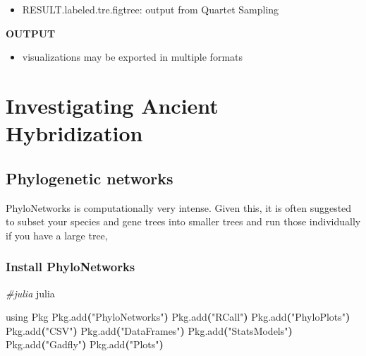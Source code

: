 \documentclass[
  12pt,
]{article}
\newenvironment{Shaded}{\begin{snugshade}}{\end{snugshade}}
\newcommand{\CommentTok}[1]{\textcolor[rgb]{0.56,0.35,0.01}{\textit{#1}}}
\newcommand{\ErrorTok}[1]{\textcolor[rgb]{0.64,0.00,0.00}{\textbf{#1}}}
\newcommand{\ExtensionTok}[1]{#1}
\newcommand{\KeywordTok}[1]{\textcolor[rgb]{0.13,0.29,0.53}{\textbf{#1}}}
\newcommand{\NormalTok}[1]{#1}
\newcommand{\StringTok}[1]{\textcolor[rgb]{0.31,0.60,0.02}{#1}}
\providecommand{\tightlist}{%
  \setlength{\itemsep}{0pt}\setlength{\parskip}{0pt}}
\begin{document}
\begin{itemize}
\tightlist
\item
  RESULT.labeled.tre.figtree: output from Quartet Sampling
\end{itemize}

\textbf{OUTPUT}

\begin{itemize}
\tightlist
\item
  visualizations may be exported in multiple formats
\end{itemize}

\hypertarget{investigating-ancient-hybridization}{%
\section{Investigating Ancient Hybridization}\label{investigating-ancient-hybridization}}

\hypertarget{phylogenetic-networks}{%
\subsection{Phylogenetic networks}\label{phylogenetic-networks}}

PhyloNetworks is computationally very intense. Given this, it is often suggested to subset your species and gene trees into smaller trees and run those individually if you have a large tree,

\hypertarget{install-phylonetworks}{%
\subsubsection{Install PhyloNetworks}\label{install-phylonetworks}}

\begin{Shaded}
\begin{Highlighting}[]
\CommentTok{\#julia}
\ExtensionTok{julia}

\ExtensionTok{using}\NormalTok{ Pkg}
\ExtensionTok{Pkg.add}\ErrorTok{(}\StringTok{"PhyloNetworks"}\KeywordTok{)}
\ExtensionTok{Pkg.add}\ErrorTok{(}\StringTok{"RCall"}\KeywordTok{)}
\ExtensionTok{Pkg.add}\ErrorTok{(}\StringTok{"PhyloPlots"}\KeywordTok{)}
\ExtensionTok{Pkg.add}\ErrorTok{(}\StringTok{"CSV"}\KeywordTok{)}
\ExtensionTok{Pkg.add}\ErrorTok{(}\StringTok{"DataFrames"}\KeywordTok{)}
\ExtensionTok{Pkg.add}\ErrorTok{(}\StringTok{"StatsModels"}\KeywordTok{)}
\ExtensionTok{Pkg.add}\ErrorTok{(}\StringTok{"Gadfly"}\KeywordTok{)}
\ExtensionTok{Pkg.add}\ErrorTok{(}\StringTok{"Plots"}\KeywordTok{)}
\end{Highlighting}
\end{Shaded}
\end{document}
